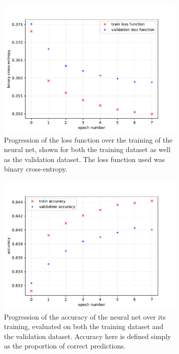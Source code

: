 \documentclass[11pt]{article}
\numberwithin{equation}{section}
\numberwithin{figure}{section}
\numberwithin{table}{section}
\begin{document}
\begin{figure}[h]%
    \centering
    \begin{subfigure}[t]{.49\linewidth}
        \centering
        \includegraphics[width=0.98\linewidth]{Plots/loss_history.pdf}
        \caption{Progression of the loss function over the training of the neural net, shown for both the training dataset as well as the validation dataset. The loss function used was binary cross-entropy.}
        \label{fig:loss_history}
    \end{subfigure}
    \hfill
    \begin{subfigure}[t]{.49\linewidth}
        \centering
        \includegraphics[width=0.98\linewidth]{Plots/accuracy_history.pdf}
        \caption{Progression of the accuracy of the neural net over its training, evaluated on both the training dataset and the validation dataset. Accuracy here is defined simply as the proportion of correct predictions.}
        \label{fig:accuracy_history}
        \begin{minipage}{.1cm}
            \vfill
        \end{minipage}
    \end{subfigure}
    \caption{}
    \label{fig:loss_accuracy}
\end{figure}
\end{document}
